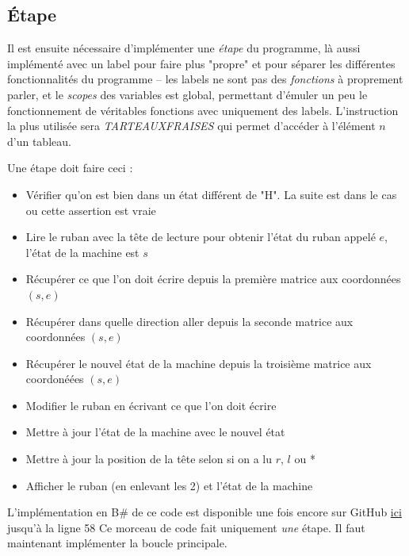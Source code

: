\documentclass[11pt,colorlinks=true,a4paper]{article}
\newcommand{\bs}{B\# }
\begin{document}
    \subsection{Étape}
    Il est ensuite nécessaire d'implémenter une \textit{étape} du programme, là aussi implémenté avec un label pour faire plus "propre" et pour séparer 
    les différentes fonctionnalités du programme -- les labels ne sont pas des \textit{fonctions} à proprement parler, et  le \textit{scopes} des variables 
    est global, permettant d'émuler un peu le fonctionnement de véritables fonctions avec uniquement des labels. L'instruction la plus utilisée sera 
    \textit{TARTEAUXFRAISES} qui permet d'accéder à l'élément $n$ d'un tableau.\par 
    \bigskip 
    Une étape doit faire ceci : 
    \begin{itemize}
        \item Vérifier qu'on est bien dans un état différent de "H". La suite est dans le cas ou cette assertion est vraie
        \item Lire le ruban avec la tête de lecture pour obtenir l'état du ruban appelé $e$, l'état de la machine est $s$ 
        \item Récupérer ce que l'on doit écrire depuis la première matrice aux coordonnées $(s,e)$
        \item Récupérer dans quelle direction aller depuis la seconde matrice aux coordonnées $(s,e)$
        \item Récupérer le nouvel état de la machine depuis la troisième matrice aux coordonéées $(s,e)$
        \item Modifier le ruban en écrivant ce que l'on doit écrire 
        \item Mettre à jour l'état de la machine avec le nouvel état 
        \item Mettre à jour la position de la tête selon si on a lu $r$, $l$ ou * 
        \item Afficher le ruban (en enlevant les 2) et l'état de la machine
    \end{itemize} 
    L'implémentation en \bs de ce code est disponible une fois encore sur GitHub \href{https://github.com/coco33920/ocaml-baguettesharp-interpreter/blob/master/examples/turing.baguette#L26}{ici} jusqu'à la ligne 58
    Ce morceau de code fait uniquement \textit{une} étape. Il faut maintenant implémenter la boucle principale.
\end{document}
